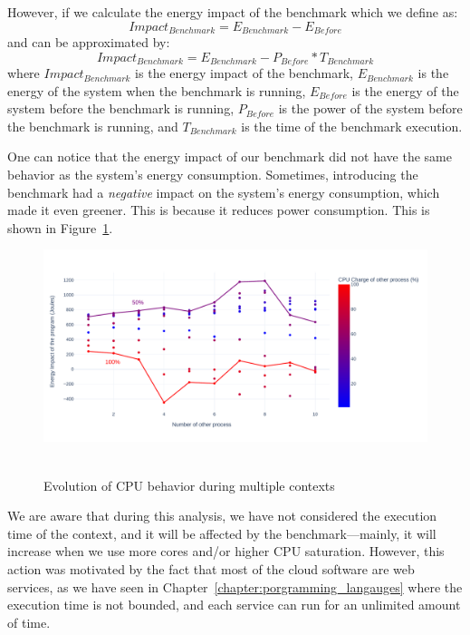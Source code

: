 However, if we calculate the energy impact of the benchmark which we define as: 
\begin{equation}
      Impact_{Benchmark} =E_{Benchmark} - E_{Before}
\end{equation}
and can be approximated by:
\begin{equation}
      Impact_{Benchmark} =E_{Benchmark} - P_{Before} * T_{Benchmark}
\end{equation}
where $Impact_{Benchmark}$ is the energy impact of the benchmark, $E_{Benchmark}$ is the energy of the system when the benchmark is running, $E_{Before}$ is the energy of the system before the benchmark is running, $P_{Before}$ is the power of the system before the benchmark is running, and $T_{Benchmark}$ is the time of the benchmark execution.

One can notice that the energy impact of our benchmark did not have the same behavior as the system's energy consumption.
Sometimes, introducing the benchmark had a \emph{negative} impact on the system's energy consumption, which made it even greener.
This is because it reduces power consumption.
This is shown in Figure~\ref{fig:green_faas_impact}.

\begin{figure}[!t]
      \centering
      \caption{Evolution of CPU behavior during multiple contexts }
      \includegraphics[width=\linewidth]{chapters/green_faas_impact}\
      \label{fig:green_faas_impact}
\end{figure}

We are aware that during this analysis, we have not considered the execution time of the context, and it will be affected by the benchmark---mainly, it will increase when we use more cores and/or higher CPU saturation.
However, this action was motivated by the fact that most of the cloud software are web services, as we have seen in Chapter~\ref{chapter:porgramming_langauges} where the execution time is not bounded, and each service can run for an unlimited amount of time.

